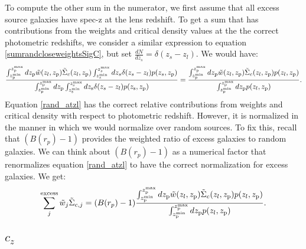 \documentclass[onecolumn,amsmath,aps,fleqn, superscriptaddress]{revtex4}
\begin{document}
To compute the other sum in the numerator, we first assume that all excess source galaxies have spec-z at the lens redshift. To get a sum that has contributions from the weights and critical density values at the the correct photometric redshifts, we consider a similar expression to equation \ref{sumrandcloseweightsSigC}, but set $\frac{dN}{dz_s} = \delta(z_s-z_l)$. We would have:
\begin{align}
\frac{\int_{z_{\rm p}^{\rm min}}^{z_{\rm p}^{\rm max}} dz_{\rm p}\tilde{w}(z_l, z_{\rm p}) \tilde{\Sigma}_c(z_l, z_{\rm p}) \int_{z_s^{\rm min}}^{z_s^{\rm max}} dz_s \delta(z_s - z_l) p(z_s, z_{\rm p})}{\int_{z_{\rm p}^{\rm min}}^{z_{\rm p}^{\rm max}} d z_{\rm p} \int_{z_{\rm s}^{\rm min}}^{z_{\rm s}^{\rm max}} dz_{\rm s} \delta(z_s - z_l) p(z_{\rm s}, z_{\rm p})} = \frac{\int_{z_{\rm p}^{\rm min}}^{z_{\rm p}^{\rm max}} dz_{\rm p}\tilde{w}(z_l, z_{\rm p}) \tilde{\Sigma}_c(z_l, z_{\rm p}) p(z_l, z_{\rm p})}{\int_{z_{\rm p}^{\rm min}}^{z_{\rm p}^{\rm max}} d z_{\rm p} p(z_l, z_{\rm p})}.
\label{rand_atzl}
\end{align}
Equation \ref{rand_atzl} has the correct relative contributions from weights and critical density with respect to photometric redshift. However, it is normalized in the manner in which we would normalize over random sources. To fix this, recall that $(B(r_p) -1)$ provides the weighted ratio of excess galaxies to random galaxies. We can think about $(B(r_p) -1)$ as a numerical factor that renormalizes equation \ref{rand_atzl} to have the correct normalization for excess galaxies. We get:
\begin{equation}
\sum\limits_{j}^{\rm excess} \tilde{w}_j \tilde{\Sigma}_{c,j} = (B(r_p) - 1) \frac{\int_{z_{\rm p}^{\rm min}}^{z_{\rm p}^{\rm max}} dz_{\rm p} \tilde{w}(z_l, z_{\rm p}) \tilde{\Sigma}_c(z_l, z_{\rm p}) p(z_l, z_{\rm p})}{\int_{z_{\rm p}^{\rm min}}^{z_{\rm p}^{\rm max}} d z_{\rm p} p(z_l, z_{\rm p})}.
\label{sumexcesswSigC}
\end{equation}

\subsection{$c_z$}
\end{document}
